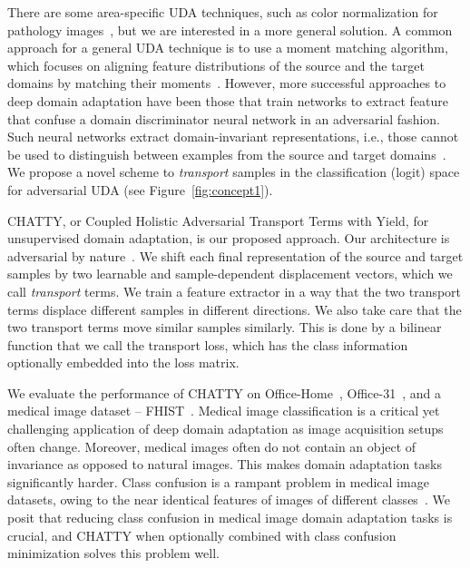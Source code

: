 \documentclass[10pt,twocolumn,letterpaper]{article}
\begin{document}
There are some area-specific UDA techniques, such as color normalization for pathology images~\cite{vahadane,fastgpu}, but we are interested in a more general solution. A common approach for a general UDA technique is to use a moment matching algorithm, which focuses on aligning feature distributions of the source and the target domains by matching their moments~\cite{mmd,mdd,deepcoral,homm,dcan}. However, more successful approaches to deep domain adaptation have been those that train networks to extract feature that confuse a domain discriminator neural network in an adversarial fashion. Such neural networks extract domain-invariant representations, i.e., those cannot be used to distinguish between examples from the source and target domains~\cite{dann,cdan}. We propose a novel scheme to \emph{transport} samples in the classification (logit) space for adversarial UDA (see Figure~\ref{fig:concept1}).

CHATTY, or Coupled Holistic Adversarial Transport Terms with Yield, for unsupervised domain adaptation, is our proposed approach. Our architecture is adversarial by nature~\cite{advda}. We shift each final representation of the source and target samples by two learnable and sample-dependent displacement vectors, which we call \emph{transport} terms. We train a feature extractor in a way that the two transport terms displace different samples in different directions. We also take care that the two transport terms move similar samples similarly. This is done by a bilinear function that we call the transport loss, which has the class information optionally embedded into the loss matrix.

We evaluate the performance of CHATTY on Office-Home~\cite{office-home}, Office-31~\cite{office31}, and a medical image dataset -- FHIST~\cite{fhist}. Medical image classification is a critical yet challenging application of deep domain adaptation as image acquisition setups often change. Moreover, medical images often do not contain an object of invariance as opposed to natural images. This makes domain adaptation tasks significantly harder. Class confusion is a rampant problem in medical image datasets, owing to the near identical features of images of different classes~\cite{mcc}. We posit that reducing class confusion in medical image domain adaptation tasks is crucial, and CHATTY when optionally combined with class confusion minimization solves this problem well.
\end{document}
